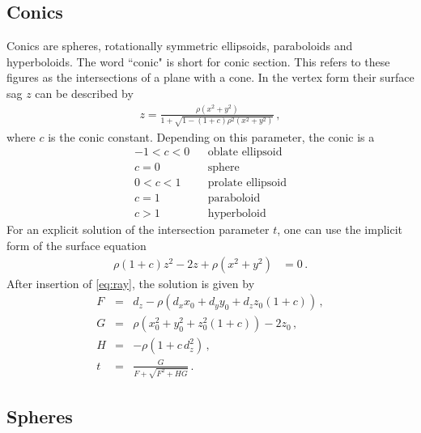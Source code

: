 \documentclass[12pt,a4paper,twoside,openright,BCOR10mm,headsepline,titlepage,abstracton,chapterprefix,final]{scrreprt}
\begin{document}
\subsection{Conics}
Conics are spheres, rotationally symmetric ellipsoids, paraboloids and hyperboloids.
The word ``conic" is short for conic section. This refers to these figures as the
intersections of a plane with a cone.
In the vertex form their surface sag $z$ can be described by
\begin{eqnarray}
 z =  \frac
 { \rho ( x^2 + y^2 ) }
 { 1 + \sqrt{1 - (1+c) \rho^2  (x^2 + y^2)} }\,,
\end{eqnarray}
where $c$ is the conic constant. Depending on this parameter, the conic is a
\begin{eqnarray*}
-1 < c < 0 && \textrm{oblate ellipsoid} \\
     c = 0 && \textrm{sphere} \\
 0 < c < 1 && \textrm{prolate ellipsoid} \\
     c = 1 && \textrm{paraboloid} \\
     c > 1 && \textrm{hyperboloid}
\end{eqnarray*}
For an explicit solution of the intersection parameter $t$,
one can use the implicit form of the surface equation
\begin{align}
 \rho (1 + c) z^2 - 2 z + \rho (x^2 + y^2) &=0\,.
\end{align}
After insertion of \eqref{eq:ray}, the solution is given by
\begin{subequations}
\label{eq:intersectionconicsection}
\begin{eqnarray}
   F &=& d_z - \rho \left( d_x x_0 + d_y y_0 + d_z z_0 (1+c) \right)\,, \\
   G &=& \rho (x_0^2 + y_0^2 + z_0^2 (1+c)) - 2 z_0\,, \\
   H &=& - \rho ( 1 + c \, d_z^2 )\,, \\
   t &=& \frac{G}{ F + \sqrt{F^2 + H G} }\,.
\end{eqnarray}
\end{subequations}



\subsection{Spheres}
\label{subsection:spheres}
\end{document}
